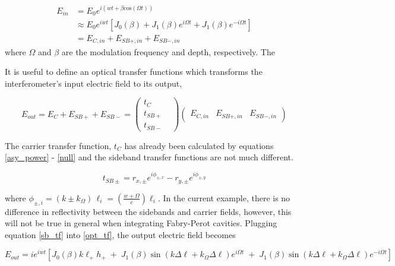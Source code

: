 		\begin{equation}\label{modE}
		\begin{aligned}
		E_{in} 	&= E_{0} e^{i(wt + \beta \text{cos} (\Omega t))} \\
				&\approx E_0 e^{iwt} [J_0(\beta) + J_1(\beta) e^{i \Omega t} + J_1(\beta) e^{-i \Omega t}] \\
				&= E_{C,in} + E_{SB+,in} + E_{SB-,in}
		\end{aligned}
		\end{equation}
		where $\Omega$ and $\beta$ are the modulation frequency and depth, respectively.  The 
		
		It is useful to define an optical transfer functions which transforms the interferometer's input electric field to its output,
		
		\begin{equation}\label{opt_tf}
		E_{out} = E_{C} + E_{SB+} + E_{SB-} = 
		\begin{pmatrix}
			t_{C} 	&   
		\\ 	t_{SB+} &
		\\ 	t_{SB-} &
		\end{pmatrix}
		\begin{pmatrix}
		E_{C,in} &    E_{SB+,in}    &  E_{SB-,in}     
		\end{pmatrix}
		\end{equation}
		
		
		The carrier transfer function, $t_{C}$ has already been calculated by equations \ref{asy_power} - \ref{null} and the sideband transfer functions are not much different.
		
		\begin{equation}\label{sb_tf}
		t_{SB\pm} = r_{x,\pm}  e^{i\phi_{\pm,x}} - r_{y,\pm}  e^{i\phi_{\pm,y}}
		\end{equation}
		
		where $\phi_{\pm,i} = (k \pm k_{\Omega}) \, \ell_{i} = (\frac{w+\Omega}{c} ) \ell_{i}$. In the current example, there is no difference in reflectivity between the sidebands and carrier fields, however, this will not be true in general when integrating Fabry-Perot cavities.  Plugging equation \ref{sb_tf} into \ref{opt_tf}, the output electric field becomes 
		
		\begin{equation}
		E_{out} = i e^{iwt} [ J_0(\beta) 	k \ell_{+}  h_{+}  \; + \; J_1(\beta) \sin( k \Delta \ell + k_{\Omega} \Delta \ell) e^{i\Omega t} \; + \; J_1(\beta) \sin( k \Delta \ell + k_{\Omega} \Delta \ell) e^{-i\Omega t} ]
		\end{equation}
		
